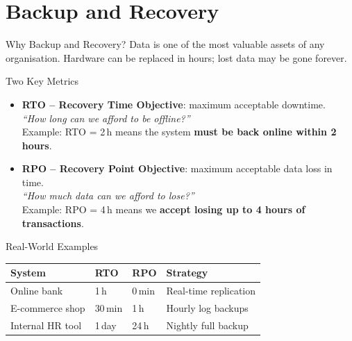 \section{Backup and Recovery}

\begin{frame}{Why Backup and Recovery?}
  Data is one of the most valuable assets of any organisation. Hardware can be
  replaced in hours; lost data may be gone forever.

  \begin{block}{Two Key Metrics}
    \begin{itemize}
      \item \textbf{RTO -- Recovery Time Objective}: maximum acceptable downtime.\\
            \textit{``How long can we afford to be offline?''}\\
            Example: RTO = 2\,h means the system \textbf{must be back online within 2 hours}.
      \item \textbf{RPO -- Recovery Point Objective}: maximum acceptable data loss in time.\\
            \textit{``How much data can we afford to lose?''}\\
            Example: RPO = 4\,h means we \textbf{accept losing up to 4 hours of transactions}.
    \end{itemize}
  \end{block}

  \begin{examples}{Real-World Examples}
    \begin{tabular}{@{}llll@{}}
      \toprule
      \textbf{System} & \textbf{RTO} & \textbf{RPO} & \textbf{Strategy} \\
      \midrule
      Online bank      & 1\,h    & 0\,min   & Real-time replication \\
      E-commerce shop  & 30\,min & 1\,h     & Hourly log backups \\
      Internal HR tool & 1\,day  & 24\,h    & Nightly full backup \\
      \bottomrule
    \end{tabular}
  \end{examples}
\end{frame}

